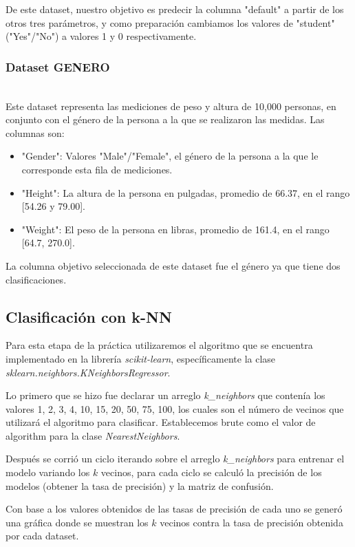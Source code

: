 \documentclass[sigconf,authorversion,nonacm]{acmart}
\begin{document}
De este dataset, nuestro objetivo es predecir la columna "default" a partir de los otros tres parámetros, y como preparación cambiamos los valores de "student" ("Yes"/"No") a valores 1 y 0 respectivamente.


\subsubsection{Dataset GENERO}\hfill\\
Este dataset representa las mediciones de peso y altura de 10,000 personas, en conjunto con el género de la persona a la que se realizaron las medidas. Las columnas son:
\begin{itemize}
  \item "Gender": Valores "Male"/"Female", el género de la persona a la que le corresponde esta fila de mediciones.
  \item "Height": La altura de la persona en pulgadas, promedio de 66.37, en el rango [54.26 y 79.00].
  \item "Weight": El peso de la persona en libras, promedio de 161.4, en el rango [64.7, 270.0].
\end{itemize}

La columna objetivo seleccionada de este dataset fue el género ya que tiene dos clasificaciones.

\subsection{Clasificación con k-NN}
Para esta etapa de la práctica utilizaremos el algoritmo que se encuentra implementado en la librería \textit{scikit-learn}, específicamente la clase \textit{sklearn.neighbors.KNeighborsRegressor}.

Lo primero que se hizo fue declarar un arreglo \textit{k\_neighbors} que contenía los valores 1, 2, 3, 4, 10, 15, 20, 50, 75, 100, los cuales son el número de vecinos que utilizará el algoritmo para clasificar. Establecemos brute como el valor de algorithm para la clase \textit{NearestNeighbors}.

Después se corrió un ciclo iterando sobre el arreglo \textit{k\_neighbors} para entrenar el modelo variando los $k$ vecinos, para cada ciclo se calculó la precisión de los modelos (obtener la tasa de precisión) y la matriz de confusión.

Con base a los valores obtenidos de las tasas de precisión de cada uno se generó una gráfica donde se muestran los $k$ vecinos contra la tasa de precisión obtenida por cada dataset.
\end{document}
